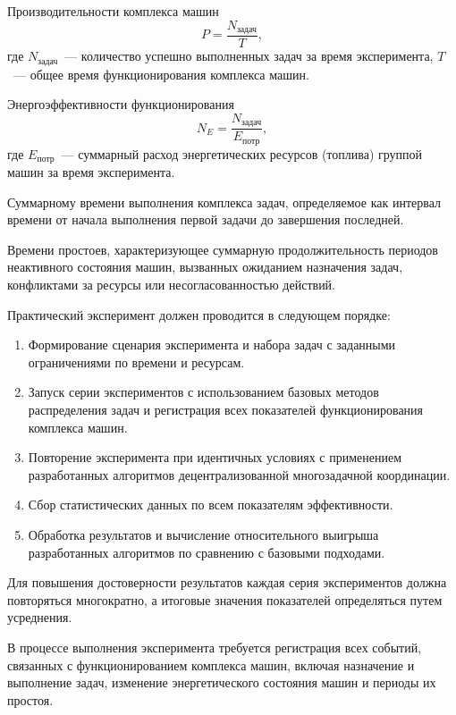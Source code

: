 Производительности комплекса машин
\begin{equation}\label{eq:exp_1}
	P = \frac{N_{\text{задач}}}{T},
\end{equation}
где $N_{\text{задач}}$~— количество успешно выполненных задач за время эксперимента, $T$~— общее время функционирования комплекса машин.

Энергоэффективности функционирования
\begin{equation}\label{eq:exp_2}
	N_E = \frac{N_{\text{задач}}}{E_{\text{потр}}},
\end{equation}
где $E_{\text{потр}}$~— суммарный расход энергетических ресурсов (топлива) группой машин за время эксперимента.

Суммарному времени выполнения комплекса задач, определяемое как интервал времени от начала выполнения первой задачи до завершения последней.

Времени простоев, характеризующее суммарную продолжительность периодов неактивного состояния машин, вызванных ожиданием назначения задач, конфликтами за ресурсы или несогласованностью действий.

Практический эксперимент должен проводится в следующем порядке:
\begin{enumerate}[beginpenalty=10000, midpenalty=10000, wide=\parindent, leftmargin=0pt]
	\item Формирование сценария эксперимента и набора задач с заданными ограничениями по времени и ресурсам.
	\item Запуск серии экспериментов с использованием базовых методов распределения задач и регистрация всех показателей функционирования комплекса машин.
	\item Повторение эксперимента при идентичных условиях с применением разработанных алгоритмов децентрализованной многозадачной координации.
	\item Сбор статистических данных по всем показателям эффективности.
	\item Обработка результатов и вычисление относительного выигрыша разработанных алгоритмов по сравнению с базовыми подходами.
\end{enumerate}

Для повышения достоверности результатов каждая серия экспериментов должна повторяться многократно, а итоговые значения показателей определяться путем усреднения.

В процессе выполнения эксперимента требуется регистрация всех событий, связанных с функционированием комплекса машин, включая назначение и выполнение задач, изменение энергетического состояния машин и периоды их простоя.

